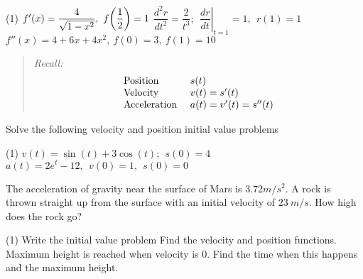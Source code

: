 \documentclass[answers]{exam}
\begin{document}
  \begin{tasks}[after-item-skip=\stretch{1}, label=\mbox{}](1)
    \task $f'(x)=\dfrac{4}{\sqrt{1-x^2}},\ f\parens{\dfrac{1}{2}}=1$
    \task $\dfrac{d^2r}{dt^2}=\dfrac{2}{t^3};\ \ \left.\dfrac{dr}{dt}\right|_{t=1}=1,\ \ r(1)=1$
    \task $f''(x)=4+6x+4x^2,\ f(0)=3,\ f(1)=10$
  \end{tasks}
  \pagebreak
  
  \noindent
  \begin{quote}
    \textit{Recall:}
      \[\begin{array}{ll}
          \textnormal{Position }& s(t)\\
          \textnormal{Velocity }& v(t)=s'(t)\\
          \textnormal{Acceleration }& a(t)=v'(t)=s''(t)
        \end{array}\]
  \end{quote}
  \begin{ex*}
    Solve the following velocity and position initial value problems
  \end{ex*}
  \begin{tasks}[after-item-skip=\stretch{1}, label=\mbox{}](1)
    \task $v(t)=\sin(t)+3\cos(t);\ \ s(0)=4$
    \task $a(t)=2e^t-12,\ \ v(0)=1,\ \ s(0)=0$
  \end{tasks}
  \pagebreak
  
  \begin{ex*}
    The acceleration of gravity near the surface of Mars is $3.72 m/s^2$. A rock is thrown straight up from the surface with an initial velocity of $23\ m/s$. How high does the rock go?
  \end{ex*}
  \begin{tasks}[after-item-skip=\stretch{1}](1)
    \task Write the initial value problem
    \task Find the velocity and position functions.
    \task Maximum height is reached when velocity is 0. Find the time when this happens and the maximum height.
  \end{tasks}
  \pagebreak
  
\end{document}
